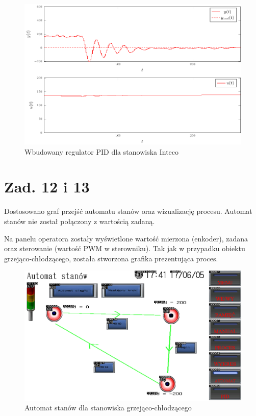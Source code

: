 \documentclass[a4paper,titlepage,11pt,twosides,floatssmall]{mwrep}
\begin{document}
\begin{figure}[]
	\centering
	\includegraphics[scale=1]{../wykresy/zad11_pid.pdf}
	\caption{Wbudowany regulator PID dla stanowiska Inteco}
	\label{zad11_pid}
\end{figure}



\chapter{Zad. 12 i 13}

Dostosowano graf przejść automatu stanów oraz wizualizację procesu. Automat stanów nie został połączony z wartością zadaną.

Na panelu operatora zostały wyświetlone wartość mierzona (enkoder), zadana oraz sterowanie (wartość PWM w sterowniku). Tak jak w przypadku obiektu grzejąco-chłodzącego, została stworzona grafika prezentująca proces.

\begin{figure}[]
	\centering
	\includegraphics[scale=0.6]{../intecographics.pdf}
	\caption{Automat stanów dla stanowiska grzejąco-chłodzącego}
	\label{zad12_graph}
\end{figure}
\end{document}
